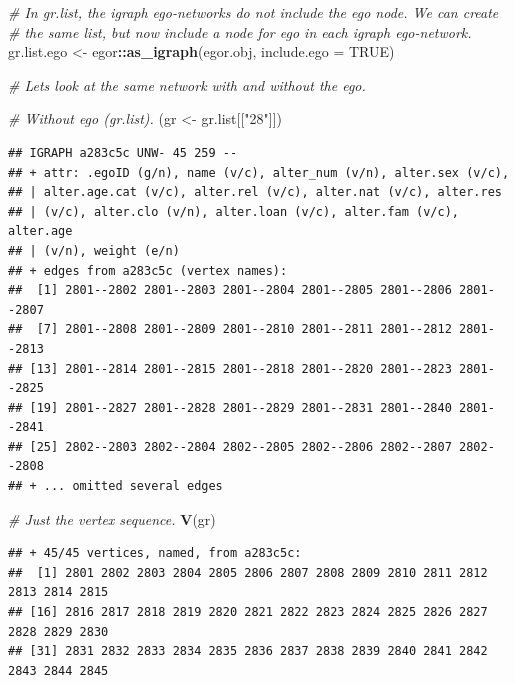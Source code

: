 \documentclass[
]{book}
\newenvironment{Shaded}{\begin{snugshade}}{\end{snugshade}}
\newcommand{\AttributeTok}[1]{\textcolor[rgb]{0.13,0.29,0.53}{#1}}
\newcommand{\CommentTok}[1]{\textcolor[rgb]{0.56,0.35,0.01}{\textit{#1}}}
\newcommand{\ConstantTok}[1]{\textcolor[rgb]{0.56,0.35,0.01}{#1}}
\newcommand{\FunctionTok}[1]{\textcolor[rgb]{0.13,0.29,0.53}{\textbf{#1}}}
\newcommand{\NormalTok}[1]{#1}
\newcommand{\OtherTok}[1]{\textcolor[rgb]{0.56,0.35,0.01}{#1}}
\newcommand{\SpecialCharTok}[1]{\textcolor[rgb]{0.81,0.36,0.00}{\textbf{#1}}}
\newcommand{\StringTok}[1]{\textcolor[rgb]{0.31,0.60,0.02}{#1}}
\begin{document}
\begin{Shaded}
\begin{Highlighting}[]
\CommentTok{\# In gr.list, the igraph ego{-}networks do not include the ego node. We can create}
\CommentTok{\# the same list, but now include a node for ego in each igraph ego{-}network.}
\NormalTok{gr.list.ego }\OtherTok{\textless{}{-}}\NormalTok{ egor}\SpecialCharTok{::}\FunctionTok{as\_igraph}\NormalTok{(egor.obj, }\AttributeTok{include.ego =} \ConstantTok{TRUE}\NormalTok{)}

\CommentTok{\# Let\textquotesingle{}s look at the same network with and without the ego.}

\CommentTok{\# Without ego (gr.list).}
\NormalTok{(gr }\OtherTok{\textless{}{-}}\NormalTok{ gr.list[[}\StringTok{"28"}\NormalTok{]])}
\end{Highlighting}
\end{Shaded}

\begin{verbatim}
## IGRAPH a283c5c UNW- 45 259 -- 
## + attr: .egoID (g/n), name (v/c), alter_num (v/n), alter.sex (v/c),
## | alter.age.cat (v/c), alter.rel (v/c), alter.nat (v/c), alter.res
## | (v/c), alter.clo (v/n), alter.loan (v/c), alter.fam (v/c), alter.age
## | (v/n), weight (e/n)
## + edges from a283c5c (vertex names):
##  [1] 2801--2802 2801--2803 2801--2804 2801--2805 2801--2806 2801--2807
##  [7] 2801--2808 2801--2809 2801--2810 2801--2811 2801--2812 2801--2813
## [13] 2801--2814 2801--2815 2801--2818 2801--2820 2801--2823 2801--2825
## [19] 2801--2827 2801--2828 2801--2829 2801--2831 2801--2840 2801--2841
## [25] 2802--2803 2802--2804 2802--2805 2802--2806 2802--2807 2802--2808
## + ... omitted several edges
\end{verbatim}

\begin{Shaded}
\begin{Highlighting}[]
\CommentTok{\# Just the vertex sequence.}
\FunctionTok{V}\NormalTok{(gr)}
\end{Highlighting}
\end{Shaded}

\begin{verbatim}
## + 45/45 vertices, named, from a283c5c:
##  [1] 2801 2802 2803 2804 2805 2806 2807 2808 2809 2810 2811 2812 2813 2814 2815
## [16] 2816 2817 2818 2819 2820 2821 2822 2823 2824 2825 2826 2827 2828 2829 2830
## [31] 2831 2832 2833 2834 2835 2836 2837 2838 2839 2840 2841 2842 2843 2844 2845
\end{verbatim}
\end{document}
